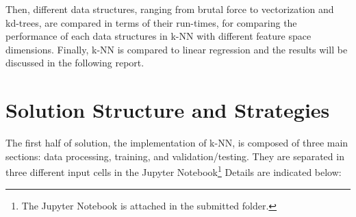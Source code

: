 \documentclass{article} %
\begin{document}
Then, different data structures, ranging from brutal force to vectorization and kd-trees, are compared in terms of their run-times, for comparing the performance of each data structures in k-NN with different feature space dimensions. Finally, k-NN is compared to linear regression and the results will be discussed in the following report.


\vspace{0.4cm}
\section*{Solution Structure and Strategies} %
The first half of solution, the implementation of k-NN, is composed of three main sections: data processing, training, and validation/testing. They are separated in three different input cells in the Jupyter Notebook\footnote{The Jupyter Notebook is attached in the submitted folder.} Details are indicated below:
\end{document}
